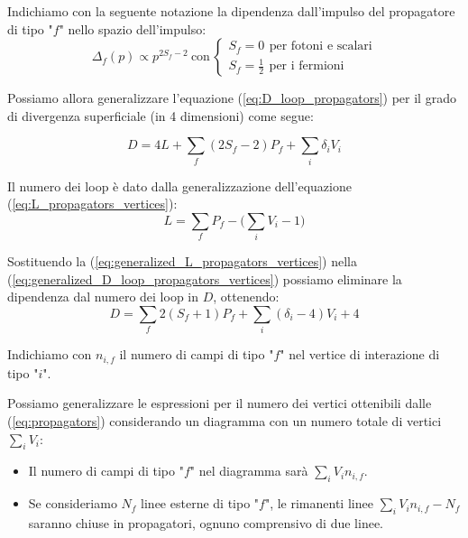 \documentclass[../main.tex]{subfiles}
\begin{document}
\begin{kaobox}
Indichiamo con la seguente notazione la dipendenza dall'impulso del propagatore di tipo "$f$" nello spazio dell'impulso:
\[
\Delta_f(p)\propto p^{2S_f-2} ~ \text{con} \, 
\begin{cases} 
S_f=0 \,~ \text{per fotoni e scalari} \\
S_f=\frac{1}{2} \,~ \text{per i fermioni} 
\end{cases}
\]
\end{kaobox}

Possiamo allora generalizzare l'equazione (\ref{eq:D_loop_propagators}) per il grado di divergenza superficiale (in 4 dimensioni) come segue:

\begin{equation}
    D = 4L+\sum_f (2S_f-2)P_f + \sum_i \delta_i V_i
    \label{eq:generalized_D_loop_propagators_vertices}
\end{equation}

Il numero dei loop è dato dalla generalizzazione dell'equazione (\ref{eq:L_propagators_vertices}):
\begin{equation}
    L = \sum_f P_f - \bigg(\sum_i V_i - 1\bigg)
    \label{eq:generalized_L_propagators_vertices}
\end{equation}

Sostituendo la (\ref{eq:generalized_L_propagators_vertices}) nella (\ref{eq:generalized_D_loop_propagators_vertices}) possiamo eliminare la dipendenza dal numero dei loop in $D$, ottenendo: 
\begin{equation}
    D = \sum_f 2(S_f+1)P_f + \sum_i (\delta_i - 4)V_i + 4
    \label{eq:generalized_D_propagators_vertices}
\end{equation}

\begin{kaobox}
Indichiamo con $n_{i,f}$ il numero di campi di tipo "$f$" nel vertice di interazione di tipo "$i$".
\end{kaobox}

Possiamo generalizzare le espressioni per il numero dei vertici ottenibili dalle (\ref{eq:propagators}) considerando un diagramma con un numero totale di vertici $\sum_iV_i$:
\begin{itemize}
    \item Il numero di campi di tipo "$f$" nel diagramma sarà $\sum_i V_i n_{i,f}$.
    \item Se consideriamo $N_f$ linee esterne di tipo "$f$", le rimanenti linee $\sum_i V_i n_{i,f} - N_f$ saranno chiuse in propagatori, ognuno comprensivo di due linee.
\end{itemize}
\end{document}
